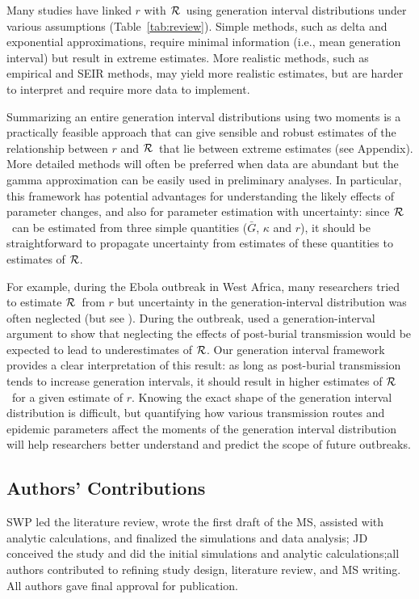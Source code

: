 \documentclass[12pt]{article}
\newcommand{\RR}{\ensuremath{{\cal R}}}
\newcommand{\tref}[1]{Table~\ref{tab:#1}}
\begin{document}
Many studies have linked $r$ with \RR\ using generation interval distributions under various assumptions (\tref{review}).
Simple methods, such as delta and exponential approximations, require minimal information (i.e., mean generation interval) but result in extreme estimates. 
More realistic methods, such as empirical and SEIR methods, may yield more realistic estimates, but are harder to interpret and require more data to implement. 

Summarizing an entire generation interval distributions using two moments is a practically feasible approach that can give sensible and robust estimates of the relationship between $r$ and \RR\ that lie between extreme estimates (see Appendix).
More detailed methods will often be preferred when data are abundant but the gamma approximation can be easily used in preliminary analyses.
In particular, this framework has potential advantages for understanding the likely effects of parameter changes, and also for parameter estimation with uncertainty: since \RR\ can be estimated from three simple quantities ($\bar G$, $\kappa$ and $r$), it should be straightforward to propagate uncertainty from estimates of these quantities to estimates of \RR.

For example, during the Ebola outbreak in West Africa, many researchers tried to estimate \RR\ from $r$ \cite{Alth14, AylwBarb14, NishChow15, RiveLofg14, 
KingDome15} but uncertainty in the generation-interval distribution was often neglected (but see \cite{TaylDush16}).  
During the outbreak, \cite{WeitDush15} used a generation-interval argument to show that neglecting the effects of post-burial transmission would be expected to lead to underestimates of \RR.
Our generation interval framework provides a clear interpretation of this result: as long as post-burial transmission tends to increase generation intervals, it should result in higher estimates of \RR\ for a given estimate of $r$.
Knowing the exact shape of the generation interval distribution is difficult, but quantifying how various transmission routes and epidemic parameters affect the moments of the generation interval distribution will help researchers better understand and predict the scope of future outbreaks.

\subsection*{Authors' Contributions}

SWP led the literature review, wrote the first draft of the MS, assisted with analytic calculations, and finalized the simulations and data analysis; JD conceived the study and did the initial simulations and analytic calculations;all authors contributed to refining study design, literature review, and MS writing. All authors gave final approval for publication.
\end{document}

